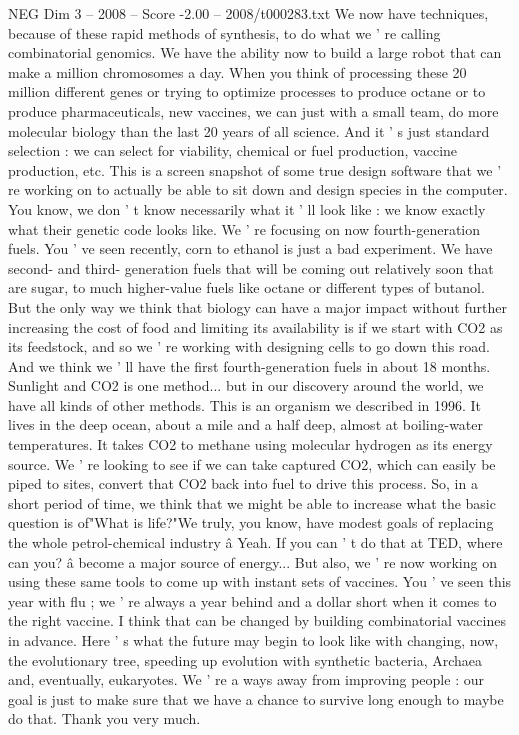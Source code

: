 \begin{textsample}{NEG Dim 3 – 2008 – Score -2.00 – 2008/t000283.txt}
We now have techniques, because of these rapid methods of synthesis, to do what we ' re calling combinatorial genomics.
We have the ability now to build a large robot that can make a million chromosomes a day.
When you think of processing these 20 million different genes or trying to optimize processes to produce octane or to produce pharmaceuticals, new vaccines, we can just with a small team, do more molecular biology than the last 20 years of all science.
And it ' s just standard selection : we can select for viability, chemical or fuel production, vaccine production, etc.
This is a screen snapshot of some true design software that we ' re working on to actually be able to sit down and design species in the computer.
You know, we don ' t know necessarily what it ' ll look like : we know exactly what their genetic code looks like.
We ' re focusing on now fourth-generation fuels.
You ' ve seen recently, corn to ethanol is just a bad experiment.
We have second- and third- generation fuels that will be coming out relatively soon that are sugar, to much higher-value fuels like octane or different types of butanol.
But the only way we think that biology can have a major impact without further increasing the cost of food and limiting its availability is if we start with CO2 as its feedstock, and so we ' re working with designing cells to go down this road.
And we think we ' ll have the first fourth-generation fuels in about 18 months.
Sunlight and CO2 is one method... but in our discovery around the world, we have all kinds of other methods.
This is an organism we described in 1996.
It lives in the deep ocean, about a mile and a half deep, almost at boiling-water temperatures.
It takes CO2 to methane using molecular hydrogen as its energy source.
We ' re looking to see if we can take captured CO2, which can easily be piped to sites, convert that CO2 back into fuel to drive this process.
So, in a short period of time, we think that we might be able to increase what the basic question is of"What is life?"We truly, you know, have modest goals of replacing the whole petrol-chemical industry â Yeah.
If you can ' t do that at TED, where can you? â become a major source of energy...
But also, we ' re now working on using these same tools to come up with instant sets of vaccines.
You ' ve seen this year with flu ; we ' re always a year behind and a dollar short when it comes to the right vaccine.
I think that can be changed by building combinatorial vaccines in advance.
Here ' s what the future may begin to look like with changing, now, the evolutionary tree, speeding up evolution with synthetic bacteria, Archaea and, eventually, eukaryotes.
We ' re a ways away from improving people : our goal is just to make sure that we have a chance to survive long enough to maybe do that.
Thank you very much.

\end{textsample}

